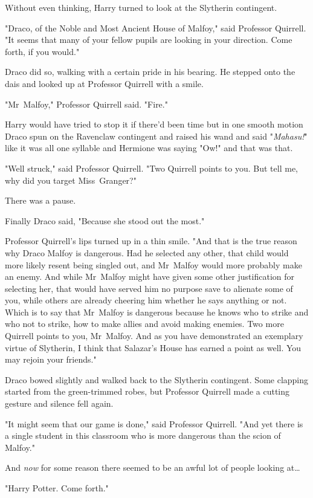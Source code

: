 Without even thinking, Harry turned to look at the Slytherin contingent.

"Draco, of the Noble and Most Ancient House of Malfoy," said Professor
Quirrell. "It seems that many of your fellow pupils are looking in your
direction. Come forth, if you would."

Draco did so, walking with a certain pride in his bearing. He stepped onto the
dais and looked up at Professor Quirrell with a smile.

"Mr~Malfoy," Professor Quirrell said. "Fire."

Harry would have tried to stop it if there’d been time but in one smooth motion
Draco spun on the Ravenclaw contingent and raised his wand and said
"\emph{Mahasu!}" like it was all one syllable and Hermione was saying "Ow!" and
that was that.

"Well struck," said Professor Quirrell. "Two Quirrell points to you. But tell
me, why did you target Miss~Granger?"

There was a pause.

Finally Draco said, "Because she stood out the most."

Professor Quirrell’s lips turned up in a thin smile. "And that is the true
reason why Draco Malfoy is dangerous. Had he selected any other, that child
would more likely resent being singled out, and Mr~Malfoy would more probably
make an enemy. And while Mr~Malfoy might have given some other justification
for selecting her, that would have served him no purpose save to alienate some
of you, while others are already cheering him whether he says anything or not.
Which is to say that Mr~Malfoy is dangerous because he knows who to strike and
who not to strike, how to make allies and avoid making enemies. Two more
Quirrell points to you, Mr~Malfoy. And as you have demonstrated an exemplary
virtue of Slytherin, I think that Salazar’s House has earned a point as well.
You may rejoin your friends."

Draco bowed slightly and walked back to the Slytherin contingent. Some clapping
started from the green-trimmed robes, but Professor Quirrell made a cutting
gesture and silence fell again.

"It might seem that our game is done," said Professor Quirrell. "And yet there
is a single student in this classroom who is more dangerous than the scion of
Malfoy."

And \emph{now} for some reason there seemed to be an awful lot of people
looking at…

"Harry Potter. Come forth."

